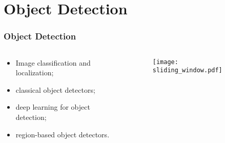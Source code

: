 \documentclass{beamer}
\begin{document}




	\section{Object Detection}

		\begin{frame}\frametitle{Object Detection}
			\begin{columns}
				\begin{column}{0.5\textwidth}
					\begin{itemize}
						\item Image classification and localization;
						\item classical object detectors;
						\item deep learning for object detection;
						\item region-based object detectors.
					\end{itemize}
				\end{column}
				\begin{column}{0.5\textwidth}
					\begin{figure}[th!]
						\centering
						\texttt{[image: sliding\_window.pdf]}
					\end{figure}
				\end{column}
			\end{columns}

		\end{frame}
\end{document}

